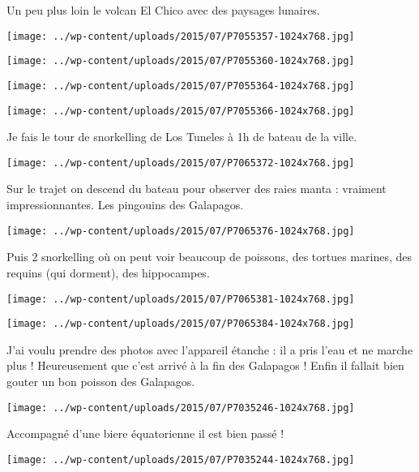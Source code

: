 Un peu plus loin le volcan El Chico avec des paysages lunaires. 
\begin{center} \texttt{[image: ../wp-content/uploads/2015/07/P7055357-1024x768.jpg]} \end{center}
\begin{center} \texttt{[image: ../wp-content/uploads/2015/07/P7055360-1024x768.jpg]} \end{center}
\begin{center} \texttt{[image: ../wp-content/uploads/2015/07/P7055364-1024x768.jpg]} \end{center}
\begin{center} \texttt{[image: ../wp-content/uploads/2015/07/P7055366-1024x768.jpg]} \end{center}
\pagebreak

Je fais le tour de snorkelling de Los Tuneles à 1h de bateau de la ville. 
\begin{center} \texttt{[image: ../wp-content/uploads/2015/07/P7065372-1024x768.jpg]} \end{center}

Sur le trajet on descend du bateau pour observer des raies manta : vraiment impressionnantes. 
Les pingouins des Galapagos. 
\begin{center} \texttt{[image: ../wp-content/uploads/2015/07/P7065376-1024x768.jpg]} \end{center}
\pagebreak

Puis 2 snorkelling où on peut voir beaucoup de poissons, des tortues marines, des requins (qui dorment), des hippocampes. 
\begin{center} \texttt{[image: ../wp-content/uploads/2015/07/P7065381-1024x768.jpg]} \end{center}
\begin{center} \texttt{[image: ../wp-content/uploads/2015/07/P7065384-1024x768.jpg]} \end{center}
\pagebreak

J'ai voulu prendre des photos avec l'appareil étanche : il a pris l'eau et ne marche plus ! Heureusement que c'est arrivé à la fin des Galapagos !
Enfin il fallait bien gouter un bon poisson des Galapagos. 
\begin{center} \texttt{[image: ../wp-content/uploads/2015/07/P7035246-1024x768.jpg]} \end{center}

Accompagné d'une biere équatorienne il est bien passé ! 
\begin{center} \texttt{[image: ../wp-content/uploads/2015/07/P7035244-1024x768.jpg]} \end{center}
